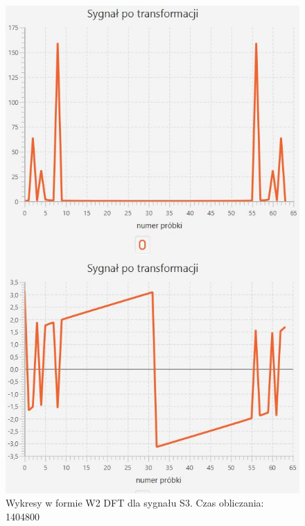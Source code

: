 \documentclass[12pt]{article}
\begin{document}
\begin{figure}[H]
	\centering
	\includegraphics[width=.8\linewidth]{DFT-S3-W2}
	\caption{Wykresy w formie W2 DFT dla sygnału S3. Czas obliczania: 1404800}
	\label{S3_sygnal}
\end{figure}
\end{document}
